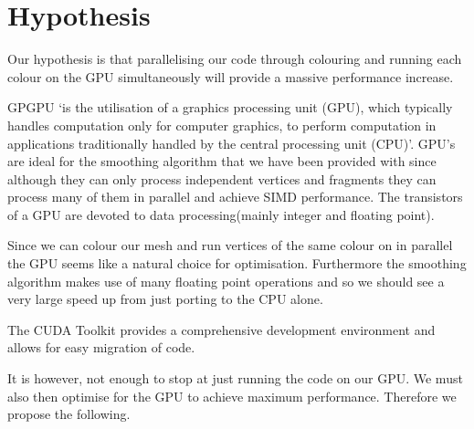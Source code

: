 \section*{Hypothesis}
Our hypothesis is that parallelising our code through colouring and running each colour on the GPU simultaneously will provide a massive performance increase.


GPGPU `is the utilisation of a graphics processing unit (GPU), which typically handles computation only for computer graphics, to perform computation in applications traditionally handled by the central processing unit (CPU)'\cite{gpgpu}.
GPU's are ideal for the smoothing algorithm that we have been provided with since although they can only process independent vertices and fragments they can process many of them in parallel and achieve SIMD performance. The transistors of a GPU are devoted to data processing(mainly integer and floating point)\cite{lec7}.


Since we can colour our mesh and run vertices of the same colour on in parallel the GPU seems like a natural choice for optimisation. Furthermore the smoothing algorithm makes use of many floating point operations and so we should see a very large speed up from just porting to the CPU alone.

The CUDA Toolkit provides a comprehensive development environment and allows for easy migration of code.




It is however, not enough to stop at just running the code on our GPU. We must also then optimise for the GPU to achieve maximum performance. Therefore we propose the following.




